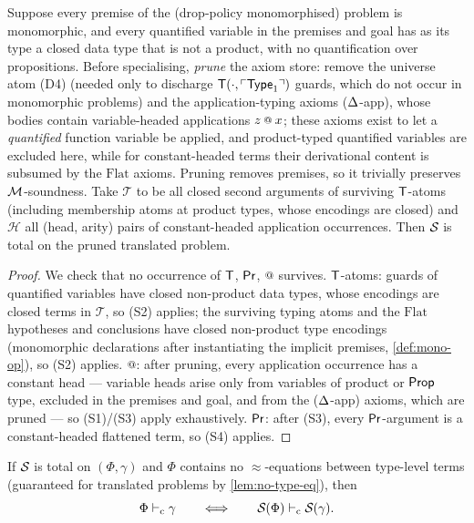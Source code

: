 \begin{lemma}
\label{lem:spec-total}
Suppose every premise of the (drop-policy monomorphised) problem is
monomorphic, and every quantified variable in the premises and goal
has as its type a closed data type that is not a product, with no
quantification over propositions.  Before specialising,
\emph{prune} the axiom store: remove the universe atom (D4) (needed
only to discharge $\mathsf{T}(\cdot, \ulcorner \mathsf{Type}_1 \urcorner)$ guards, which
do not occur in monomorphic problems) and the application-typing
axioms ($\Delta$-app), whose bodies contain variable-headed
applications $z \app x$; these axioms exist to let a
\emph{quantified} function variable be applied, and product-typed
quantified variables are excluded here, while for constant-headed
terms their derivational content is subsumed by the
$\mathrm{Flat}$ axioms.  Pruning removes premises, so it trivially
preserves $\mathcal{M}$-soundness.  Take $\mathcal{T}$ to be all closed
second arguments of surviving $\mathsf{T}$-atoms (including
membership atoms at product types, whose encodings are closed) and
$\mathcal{H}$ all (head, arity) pairs of constant-headed
application occurrences.  Then $\mathcal{S}_{}$ is total on the pruned
translated problem.
\end{lemma}

\begin{proof}
We check that no occurrence of $\mathsf{T}$, $\mathsf{Pr}$, $\app$ survives.
$\mathsf{T}$-atoms: guards of quantified variables have closed
non-product data types, whose encodings are closed terms in
$\mathcal{T}$, so (S2) applies; the surviving typing atoms and the
$\mathrm{Flat}$ hypotheses and conclusions have closed non-product
type encodings (monomorphic declarations after instantiating the
implicit premises, \cref{def:mono-op}), so (S2) applies.  $\app$:
after pruning, every application occurrence has a constant head ---
variable heads arise only from variables of product or $\mathsf{Prop}$
type, excluded in the premises and goal, and from the ($\Delta$-app)
axioms, which are pruned --- so (S1)/(S3) apply exhaustively.
$\mathsf{Pr}$: after (S3), every $\mathsf{Pr}$-argument is a constant-headed
flattened term, so (S4) applies.
\end{proof}

\begin{theorem}
\label{thm:spec-faithful}
If $\mathcal{S}_{}$ is total on $(\Phi, \gamma)$ and $\Phi$ contains no
$\approx$-equations between type-level terms (guaranteed for
translated problems by \cref{lem:no-type-eq}), then
\[
  \Phi \vdash_{\mathrm{c}} \gamma
  \qquad\Longleftrightarrow\qquad
  \mathcal{S}_{}(\Phi) \vdash_{\mathrm{c}} \mathcal{S}_{}(\gamma) .
\]
\end{theorem}

